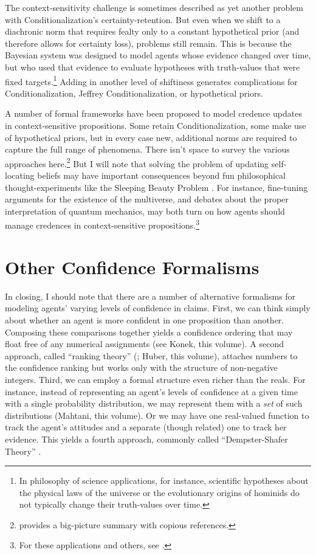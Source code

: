 The context-sensitivity challenge is sometimes described as yet another problem with Conditionalization's certainty-retention. But even when we shift to a diachronic norm that requires fealty only to a constant hypothetical prior (and therefore allows for certainty loss), problems still remain. This is because the Bayesian system was designed to model agents whose evidence changed over time, but who used that evidence to evaluate hypotheses with truth-values that were fixed targets.\footnote
{In philosophy of science applications, for instance, scientific hypotheses about the physical laws of the universe or the evolutionary origins of hominids do not typically change their truth-values over time.}
 Adding in another level of shiftiness generates complications for Conditionalization, Jeffrey Conditionalization, or hypothetical priors.
 
A number of formal frameworks have been proposed to model credence updates in context-sensitive propositions. Some retain Conditionalization, some make use of hypothetical priors, but in every case new, additional norms are required to capture the full range of phenomena. There isn't space to survey the various approaches here.\footnote
{\citet{TitelbaumSelfLocating} provides a big-picture summary with copious references.}
 But I will note that solving the problem of updating self-locating beliefs may have important consequences beyond fun philosophical thought-experiments like the Sleeping Beauty Problem \citep{ElgaBeauty}. For instance, fine-tuning arguments for the existence of the multiverse, and debates about the proper interpretation of quantum mechanics, may both turn on how agents should manage credences in context-sensitive propositions.\footnote
 {For these applications and others, see \citet{TitelbaumTenReasons}.}
 
 
\section{Other Confidence Formalisms} \label{s:extensions}
In closing, I should note that there are a number of alternative formalisms for modeling agents' varying levels of confidence in claims. First, we can think simply about whether an agent is more confident in one proposition than another. Composing these comparisons together yields a confidence ordering that may float free of any numerical assignments (see Konek, this volume). A second approach, called ``ranking theory'' (\citealp{SpohnLaws}; Huber, this volume), attaches numbers to the confidence ranking but works only with the structure of non-negative integers. Third, we can employ a formal structure even richer than the reals. For instance, instead of representing an agent's levels of confidence at a given time with a single probability distribution, we may represent them with a \emph{set} of such distributions (Mahtani, this volume). Or we may have one real-valued function to track the agent's attitudes and a separate (though related) one to track her evidence. This yields a fourth approach, commonly called ``Dempster-Shafer Theory'' \citep{DempsterNewMethods,ShaferMathematicalTheory}.

